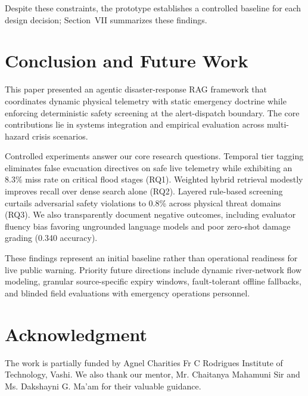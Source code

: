 \documentclass[conference]{IEEEtran}
\begin{document}
Despite these constraints, the prototype establishes a controlled baseline for each design decision; Section~VII summarizes these findings.

\section{Conclusion and Future Work}
This paper presented an agentic disaster-response RAG framework that coordinates dynamic physical telemetry with static emergency doctrine while enforcing deterministic safety screening at the alert-dispatch boundary. The core contributions lie in systems integration and empirical evaluation across multi-hazard crisis scenarios.

Controlled experiments answer our core research questions. Temporal tier tagging eliminates false evacuation directives on safe live telemetry while exhibiting an 8.3\% miss rate on critical flood stages (RQ1). Weighted hybrid retrieval modestly improves recall over dense search alone (RQ2). Layered rule-based screening curtails adversarial safety violations to 0.8\% across physical threat domains (RQ3). We also transparently document negative outcomes, including evaluator fluency bias favoring ungrounded language models and poor zero-shot damage grading (0.340 accuracy).

These findings represent an initial baseline rather than operational readiness for live public warning. Priority future directions include dynamic river-network flow modeling, granular source-specific expiry windows, fault-tolerant offline fallbacks, and blinded field evaluations with emergency operations personnel.

\section*{Acknowledgment}
The work is partially funded by Agnel Charities Fr C Rodrigues Institute of Technology, Vashi. We also thank our mentor, Mr. Chaitanya Mahamuni Sir and Ms. Dakshayni G. Ma'am for their valuable guidance.
\end{document}
